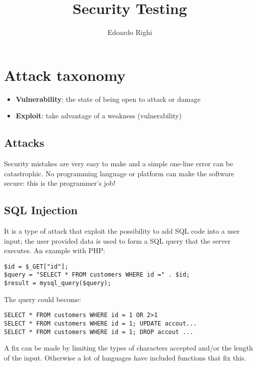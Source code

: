 \documentclass[a4paper, 10pt, titlepage]{article}
\begin{document}
	\title{Security Testing}
	\author{Edoardo Righi}
	\maketitle
	\tableofcontents
	
	\newpage
	\section{Attack taxonomy}
	\begin{itemize}
	\item \textbf{Vulnerability}: the state of being open to attack or damage
	\item \textbf{Exploit}: take advantage of a weakness (vulnerability)
	\end{itemize}
	\subsection{Attacks}
	Security mistakes are very easy to make and a simple one-line error can be catastrophic. No programming language or platform can make the software secure: this is the programmer’s job!
	
	\subsection*{SQL Injection}
	It is a type of attack that exploit the possibility to add SQL code into a user input; the user provided data is used to form a SQL query that the server executes. An example with PHP:
	\begin{lstlisting}
$id = $_GET["id"];
$query = "SELECT * FROM customers WHERE id =" . $id;
$result = mysql_query($query);
	\end{lstlisting}
	The query could become:
	\begin{lstlisting}
SELECT * FROM customers WHERE id = 1 OR 2>1
SELECT * FROM customers WHERE id = 1; UPDATE accout...
SELECT * FROM customers WHERE id = 1; DROP accout ...
	\end{lstlisting}
	A fix can be made by limiting the types of characters accepted and/or the length of the input. Otherwise a lot of languages have included functions that fix this.
	
\end{document}
